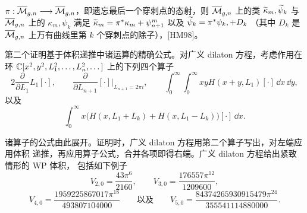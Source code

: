$\pi:\overline{\mathcal{M}}_{g,n}\longrightarrow\overline{\mathcal{M}}_{g,n}$，即遗忘最后一个穿刺点的态射，则 $\overline{\mathcal{M}}_{g,n}$ 上的类
$\widetilde{\kappa}_m,\widetilde{\psi}_k$ 与 $\overline{\mathcal{M}}_{g,n}$ 上的 $\kappa_m,\psi_k$ 满足
$\widetilde{\kappa}_m=\pi^*\kappa_m+\psi_{n+1}^m$ 以及 $\widetilde{\psi}_k=\pi^*\psi_k,+D_k$
（其中 $D_k$ 是 $\overline{\mathcal{M}}_{g,n}$ 上万有曲线里第 $k$ 个穿刺点的除子），[HM98]。



第二个证明基于体积递推中诸运算的精确公式。对广义 dilaton 方程，考虑作用在环
$\mathbb{C}[x^2,y^2,L_1^2,\dots,L_n^2,\dots]$ 上的下列四个算子
\[
2\frac{\partial}{\partial L_1}L_1[\cdot],\qquad
\frac{\partial}{\partial L_{n+1}}[\cdot]\Big|_{L_{n+1}=2\pi i},\qquad
\int_0^{\infty}\!\!\int_0^{\infty}xyH(x+y,L_1)[\cdot]\,\dd x\,\dd y,
\]
以及
\[
\int_0^{\infty}x\big(H(x,L_1+L_k)+H(x,L_1-L_k)\big)[\cdot]\,\dd x.
\]


诸算子的公式由此展开。证明时，广义 dilaton 方程用第二个算子写出，对左端应用体积
递推，再应用算子公式，合并各项即得右端。广义 dilaton 方程给出紧致情形的 WP 体积，
包括如下例子
\[
V_{2,0}=\frac{43\pi^6}{2160},\qquad
V_{3,0}=\frac{176557\pi^{12}}{1209600},
\]
\[
V_{4,0}=\frac{1959225867017\pi^{18}}{493807104000}
\qquad\text{以及}\qquad
V_{5,0}=\frac{84374265930915479\pi^{24}}{355541114880000}.
\]

